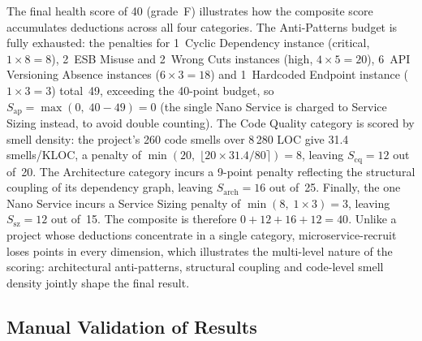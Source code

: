 \par The final health score of 40 (grade~F) illustrates how the composite score accumulates deductions across all four categories. The Anti-Patterns budget is fully exhausted: the penalties for 1~Cyclic Dependency instance (critical, $1 \times 8 = 8$), 2~ESB Misuse and 2~Wrong Cuts instances (high, $4 \times 5 = 20$), 6~API Versioning Absence instances ($6 \times 3 = 18$) and 1~Hardcoded Endpoint instance ($1 \times 3 = 3$) total~49, exceeding the 40-point budget, so $S_{\mathrm{ap}} = \max(0,\; 40 - 49) = 0$ (the single Nano Service is charged to Service Sizing instead, to avoid double counting). The Code Quality category is scored by smell density: the project's 260 code smells over 8\,280 LOC give 31.4 smells/KLOC, a penalty of $\min(20,\; \lfloor 20 \times 31.4 / 80 \rceil) = 8$, leaving $S_{\mathrm{cq}} = 12$ out of~20. The Architecture category incurs a 9-point penalty reflecting the structural coupling of its dependency graph, leaving $S_{\mathrm{arch}} = 16$ out of~25. Finally, the one Nano Service incurs a Service Sizing penalty of $\min(8,\; 1 \times 3) = 3$, leaving $S_{\mathrm{sz}} = 12$ out of~15. The composite is therefore $0 + 12 + 16 + 12 = 40$. Unlike a project whose deductions concentrate in a single category, microservice-recruit loses points in every dimension, which illustrates the multi-level nature of the scoring: architectural anti-patterns, structural coupling and code-level smell density jointly shape the final result.

\subsection{Manual Validation of Results}
\label{sec:manual-validation}

